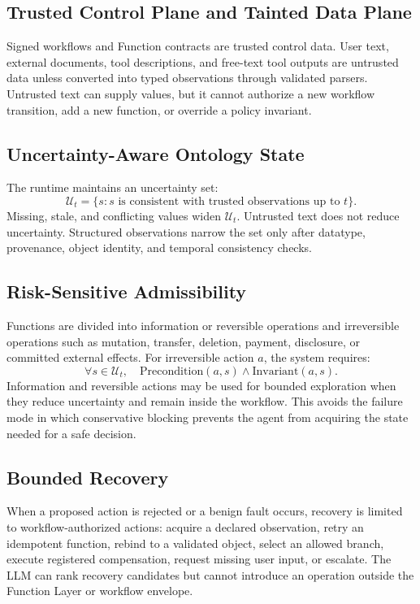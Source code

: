 \documentclass[10pt,twocolumn]{article}
\begin{document}
\subsection{Trusted Control Plane and Tainted Data Plane}
Signed workflows and Function contracts are trusted control data. User text, external documents, tool descriptions, and free-text tool outputs are untrusted data unless converted into typed observations through validated parsers. Untrusted text can supply values, but it cannot authorize a new workflow transition, add a new function, or override a policy invariant.

\subsection{Uncertainty-Aware Ontology State}
The runtime maintains an uncertainty set:
\[
\mathcal{U}_t=\{s: s \text{ is consistent with trusted observations up to } t\}.
\]
Missing, stale, and conflicting values widen $\mathcal{U}_t$. Untrusted text does not reduce uncertainty. Structured observations narrow the set only after datatype, provenance, object identity, and temporal consistency checks.

\subsection{Risk-Sensitive Admissibility}
Functions are divided into information or reversible operations and irreversible operations such as mutation, transfer, deletion, payment, disclosure, or committed external effects. For irreversible action $a$, the system requires:
\[
\forall s\in\mathcal{U}_t,\quad \mathrm{Precondition}(a,s)\wedge \mathrm{Invariant}(a,s).
\]
Information and reversible actions may be used for bounded exploration when they reduce uncertainty and remain inside the workflow. This avoids the failure mode in which conservative blocking prevents the agent from acquiring the state needed for a safe decision.

\subsection{Bounded Recovery}
When a proposed action is rejected or a benign fault occurs, recovery is limited to workflow-authorized actions: acquire a declared observation, retry an idempotent function, rebind to a validated object, select an allowed branch, execute registered compensation, request missing user input, or escalate. The LLM can rank recovery candidates but cannot introduce an operation outside the Function Layer or workflow envelope.
\end{document}
